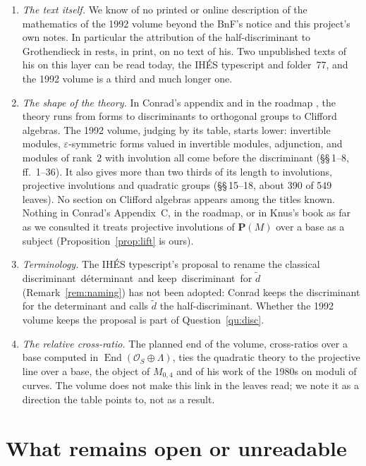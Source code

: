 \documentclass[11pt,a4paper]{amsart}
\newcommand{\q}[1]{\guillemotleft\,#1\,\guillemotright}
\newcommand{\cO}{\mathcal{O}}
\newcommand{\End}{\operatorname{End}}
\newcommand{\Pj}{\mathbf{P}}
\theoremstyle{plain}
\theoremstyle{definition}
\begin{document}
\begin{enumerate}
\item \emph{The text itself.} We know of no printed or online description of the mathematics of the 1992 volume beyond the BnF's notice and this project's own notes. In particular the attribution of the half-discriminant to Grothendieck in \cite[\S\,C.1]{conrad} rests, in print, on no text of his. Two unpublished texts of his on this layer can be read today, the IHÉS typescript and folder~77, and the 1992 volume is a third and much longer one.
\item \emph{The shape of the theory.} In Conrad's appendix and in the roadmap \cite{roadmap}, the theory runs from forms to discriminants to orthogonal groups to Clifford algebras. The 1992 volume, judging by its table, starts lower: invertible modules, $\varepsilon$-symmetric forms valued in invertible modules, adjunction, and modules of rank~$2$ with involution all come before the discriminant (\S\S\,1--8, ff.~1--36). It also gives more than two thirds of its length to involutions, projective involutions and quadratic groups (\S\S\,15--18, about 390 of 549 leaves). No section on Clifford algebras appears among the titles known. Nothing in Conrad's Appendix~C, in the roadmap, or in Knus's book as far as we consulted it treats projective involutions of $\Pj(M)$ over a base as a subject (Proposition~\ref{prop:lift} is ours).
\item \emph{Terminology.} The IHÉS typescript's proposal to rename the classical discriminant \q{déterminant} and keep \q{discriminant} for $\tilde d$ (Remark~\ref{rem:naming}) has not been adopted: Conrad keeps the discriminant for the determinant and calls $\tilde d$ the half-discriminant. Whether the 1992 volume keeps the proposal is part of Question~\ref{qu:disc}.
\item \emph{The relative cross-ratio.} The planned end of the volume, cross-ratios over a base computed in $\End(\cO_S\oplus\Lambda)$, ties the quadratic theory to the projective line over a base, the object of $M_{0,4}$ and of his work of the 1980s on moduli of curves. The volume does not make this link in the leaves read; we note it as a direction the table points to, not as a result.
\end{enumerate}

\section{What remains open or unreadable}\label{sec:open}
\end{document}
